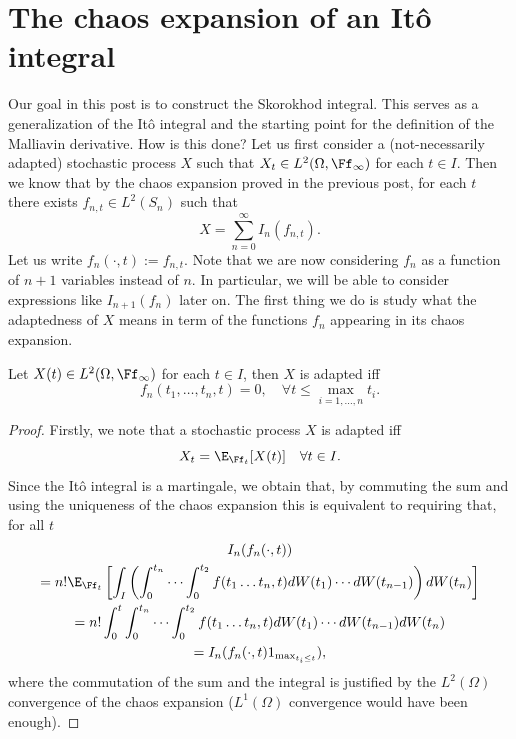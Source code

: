 \documentclass[
    a4paper,
    DIV=14,
    abstract=true,
    numbers=noenddot
]{scrartcl}
\begin{document}
\section{The chaos expansion of an Itô integral}
Our goal in this post is to construct the Skorokhod integral. This serves as a generalization of the Itô integral and the starting point for the definition of the Malliavin derivative. How is this done? Let us first consider a (not-necessarily adapted) stochastic process $X$ such that $X_t\in L^2(\Omega,\Ff_\infty)$ for each $t \in I$. Then we know that by the chaos expansion proved in the previous post, for each $t$ there exists  $f_{n,t}\in L^2(S_n)$ such that
\begin{equation*}
	X=\sum_{n=0}^{\infty} I_n(f_{n,t}).
\end{equation*}
Let us write $f_{n}(\cdot,t):=f_{n,t}$. Note that we are now considering $f_n$ as a function of $n+1$ variables instead of  $n$. In particular, we will be able to consider expressions like  $I_{n+1}(f_n)$ later on. The first thing we do is study what the adaptedness of $X$ means in term of the functions $f_n$ appearing in its chaos expansion.
\begin{lemma}\label{zerolemma}
	Let $X(t) \in L^2(\Omega,\Ff_\infty)$ for each $t \in  I$, then $X$ is adapted iff
	\begin{equation*}
		f_n(t_1,\ldots,t_n,t)=0,\quad\forall t\leq\max_{i=1,\ldots,n} t_i .
	\end{equation*}
\end{lemma}
\begin{proof}
	Firstly, we note that a stochastic process $X$ is adapted iff $$X_t=\E_{\Ff_t}[X(t)]\quad\forall t\in I.$$ Since the Itô integral is a martingale, we obtain that, by commuting the sum and using the uniqueness of the chaos expansion this is equivalent to requiring that, for all $t$
	\begin{multline*}
		I_n(f_n(\cdot,t))\\=	n!\E_{\Ff_t} \left[\int_{I} \left( \int_{0}^{t_n}\cdots \int_{0}^{t_2}f(t_1\ldots t_n,t) dW(t_1) \cdots dW(t_{n-1}) \right)dW(t_n)\right]\\
		=n!\int_{0}^t \int_{0}^{t_n}\cdots \int_{0}^{t_2}f(t_1\ldots t_n,t) dW(t_1) \cdots dW(t_{n-1})dW(t_n)\\= I_n(f_n(\cdot,t) 1_{\max_{t_i\leq t}}),
	\end{multline*}
	where the commutation of the sum and the integral is justified by the $L^2(\Omega)$ convergence of the chaos expansion ($L^1(\Omega)$ convergence would have been enough).
\end{proof}
\end{document}
